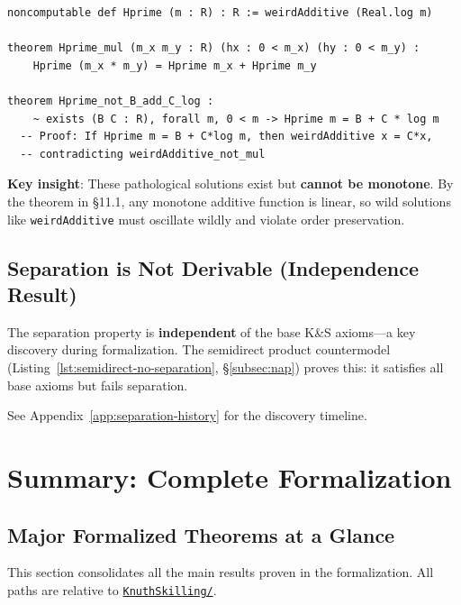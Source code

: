 \documentclass[11pt]{article}
\theoremstyle{definition}
\theoremstyle{remark}
\begin{document}
\begin{lstlisting}[caption={Multiplicative-additive pathology on positive reals}]
noncomputable def Hprime (m : R) : R := weirdAdditive (Real.log m)

theorem Hprime_mul (m_x m_y : R) (hx : 0 < m_x) (hy : 0 < m_y) :
    Hprime (m_x * m_y) = Hprime m_x + Hprime m_y

theorem Hprime_not_B_add_C_log :
    ~ exists (B C : R), forall m, 0 < m -> Hprime m = B + C * log m
  -- Proof: If Hprime m = B + C*log m, then weirdAdditive x = C*x,
  -- contradicting weirdAdditive_not_mul
\end{lstlisting}

\textbf{Key insight}: These pathological solutions exist but \textbf{cannot be monotone}.
By the theorem in \S11.1, any monotone additive function is linear, so wild solutions
like \texttt{weirdAdditive} must oscillate wildly and violate order preservation.

\subsection{Separation is Not Derivable (Independence Result)}
\label{subsec:separation-independence}

The separation property is \textbf{independent} of the base K\&S axioms---a key discovery during formalization. The semidirect product countermodel (Listing~\ref{lst:semidirect-no-separation}, \S\ref{subsec:nap}) proves this: it satisfies all base axioms but fails separation.

See Appendix~\ref{app:separation-history} for the discovery timeline.

\newpage
\section{Summary: Complete Formalization}

\subsection{Major Formalized Theorems at a Glance}

This section consolidates all the main results proven in the formalization.
All paths are relative to \href{https://github.com/zariuq/ks-foundations-of-inference/tree/main/KnuthSkilling/}{\texttt{KnuthSkilling/}}.
\end{document}

